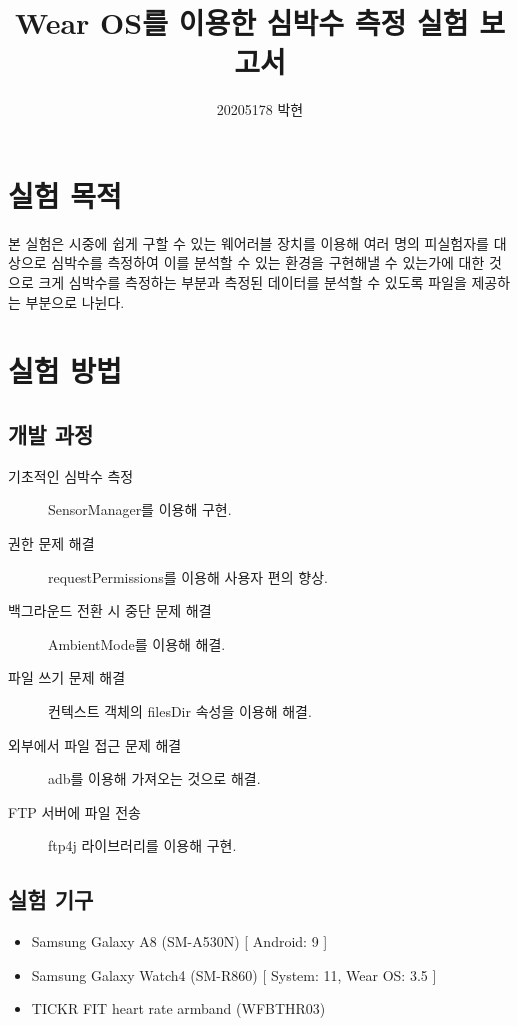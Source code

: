 \documentclass[11pt]{article}
\title{Wear OS를 이용한 심박수 측정 실험 보고서}
\author{20205178 박현}
\date{}
\begin{document}
    \maketitle
    \section{실험 목적}
    본 실험은 시중에 쉽게 구할 수 있는 웨어러블 장치를 이용해 
    여러 명의 피실험자를 대상으로 심박수를 측정하여 이를 분석할 수 있는 
    환경을 구현해낼 수 있는가에 대한 것으로 크게 심박수를 측정하는 부분과
    측정된 데이터를 분석할 수 있도록 파일을 제공하는 부분으로 나뉜다. 
    
    \section{실험 방법}
    \subsection*{개발 과정}
    \hspace{0cm}
    \begin{description}
        \item[\hspace{0.5cm}기초적인 심박수 측정] SensorManager를 이용해 구현.
        \item[\hspace{0.5cm}권한 문제 해결] requestPermissions를 이용해 사용자 편의 향상.
        \item[\hspace{0.5cm}백그라운드 전환 시 중단 문제 해결] AmbientMode를 이용해 해결.
        \item[\hspace{0.5cm}파일 쓰기 문제 해결] 컨텍스트 객체의 filesDir 속성을 이용해 해결.
        \item[\hspace{0.5cm}외부에서 파일 접근 문제 해결] adb를 이용해 가져오는 것으로 해결.
        \item[\hspace{0.5cm}FTP 서버에 파일 전송] ftp4j 라이브러리를 이용해 구현.
    \end{description}
    \subsection*{실험 기구}
    \hspace{0cm}
    \begin{itemize}
        \item Samsung Galaxy A8 (SM-A530N) [ Android: 9 ]
        \item Samsung Galaxy Watch4 (SM-R860) [ System: 11, Wear OS: 3.5 ]
        \item TICKR FIT heart rate armband (WFBTHR03)
    \end{itemize}
\end{document}
